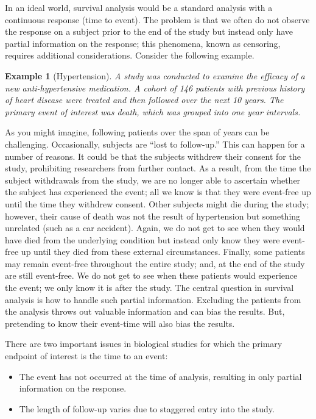 \documentclass[
]{book}
\providecommand{\tightlist}{%
  \setlength{\itemsep}{0pt}\setlength{\parskip}{0pt}}
\theoremstyle{plain}
\theoremstyle{mydefn}
\theoremstyle{myexmpl}
\newtheorem{example}{Example}[chapter]
\theoremstyle{remark}
\begin{document}
In an ideal world, survival analysis would be a standard analysis with a continuous response (time to event). The problem is that we often do not observe the response on a subject prior to the end of the study but instead only have partial information on the response; this phenomena, known as censoring, requires additional considerations. Consider the following example.

\begin{example}[Hypertension]
\protect\hypertarget{exm:surv-hypertension}{}{\label{exm:surv-hypertension} {} }A study was conducted to examine the efficacy of a new anti-hypertensive medication. A cohort of 146 patients with previous history of heart disease were treated and then followed over the next 10 years. The primary event of interest was death, which was grouped into one year intervals.
\end{example}

As you might imagine, following patients over the span of years can be challenging. Occasionally, subjects are ``lost to follow-up.'' This can happen for a number of reasons. It could be that the subjects withdrew their consent for the study, prohibiting researchers from further contact. As a result, from the time the subject withdrawals from the study, we are no longer able to ascertain whether the subject has experienced the event; all we know is that they were event-free up until the time they withdrew consent. Other subjects might die during the study; however, their cause of death was not the result of hypertension but something unrelated (such as a car accident). Again, we do not get to see when they would have died from the underlying condition but instead only know they were event-free up until they died from these external circumstances. Finally, some patients may remain event-free throughout the entire study; and, at the end of the study are still event-free. We do not get to see when these patients would experience the event; we only know it is after the study. The central question in survival analysis is how to handle such partial information. Excluding the patients from the analysis throws out valuable information and can bias the results. But, pretending to know their event-time will also bias the results.

There are two important issues in biological studies for which the primary endpoint of interest is the time to an event:

\begin{itemize}
\tightlist
\item
  The event has not occurred at the time of analysis, resulting in only partial information on the response.
\item
  The length of follow-up varies due to staggered entry into the study.
\end{itemize}
\end{document}
